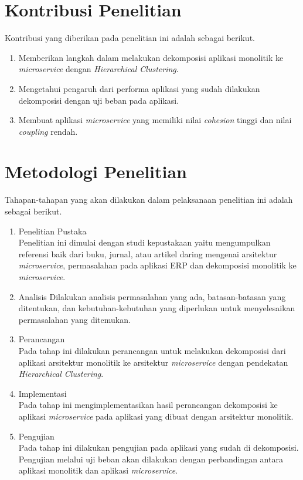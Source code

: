 \section{Kontribusi Penelitian}
Kontribusi yang diberikan pada penelitian ini adalah sebagai berikut.
\begin{enumerate}[nolistsep,leftmargin=0.5cm]
  \item Memberikan langkah dalam melakukan dekomposisi aplikasi monolitik ke \textit{microservice} dengan \textit{Hierarchical Clustering}.
  \item Mengetahui pengaruh dari performa aplikasi yang sudah dilakukan dekomposisi dengan uji beban pada aplikasi.
  \item Membuat aplikasi \textit{microservice} yang memiliki nilai \textit{cohesion} tinggi dan nilai \textit{coupling} rendah.
\end{enumerate}

\section{Metodologi Penelitian}
Tahapan-tahapan yang akan dilakukan dalam pelaksanaan penelitian ini adalah sebagai berikut.
\begin{enumerate}[nolistsep,leftmargin=0.5cm]
  \item Penelitian Pustaka \\
  Penelitian ini dimulai dengan studi kepustakaan yaitu mengumpulkan referensi baik dari buku, jurnal, atau artikel daring mengenai arsitektur \textit{microservice}, permasalahan pada aplikasi ERP dan dekomposisi monolitik ke \textit{microservice}.
  \item Analisis
  Dilakukan analisis permasalahan yang ada, batasan-batasan yang ditentukan, dan  kebutuhan-kebutuhan yang diperlukan untuk menyelesaikan permasalahan yang ditemukan.
  \item Perancangan \\
  Pada tahap ini dilakukan perancangan untuk melakukan dekomposisi dari aplikasi arsitektur monolitik ke arsitektur \textit{microservice} dengan pendekatan \textit{Hierarchical Clustering}.
  \item Implementasi \\
  Pada tahap ini mengimplementasikan hasil perancangan dekomposisi ke aplikasi \textit{microservice} pada aplikasi yang dibuat dengan arsitektur monolitik.
  \item Pengujian \\
  Pada tahap ini  dilakukan pengujian pada aplikasi yang sudah di dekomposisi. Pengujian melalui uji beban akan dilakukan dengan perbandingan antara aplikasi monolitik dan aplikasi \textit{microservice}.\\ 
\end{enumerate}

